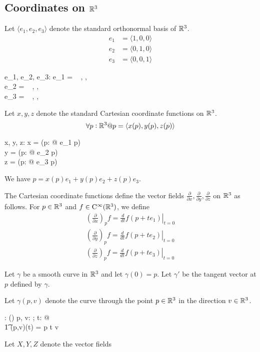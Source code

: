\documentclass[11pt, oneside]{article}
\begin{document}
\subsection{Coordinates on $\mathbb{R}^3$}

Let $\langle e_1, e_2, e_3 \rangle$ denote the standard orthonormal basis of $\mathbb{R}^3$.
\begin{align}
e_1 & = \langle1, 0, 0 \rangle \\
e_2 & = \langle 0, 1, 0 \rangle \\
e_3 & = \langle 0, 0, 1 \rangle
\end{align}
\begin{axdef}
	e_1, e_2, e_3: \Rthree
\where
	e_1 = \langle~ \oneR, \zeroR, \zeroR ~\rangle \\
	e_2 = \langle~ \zeroR, \oneR, \zeroR ~\rangle \\
	e_3 = \langle~ \zeroR, \zeroR, \oneR ~\rangle
\end{axdef}

Let $x, y, z$ denote the standard Cartesian coordinate functions on $\mathbb{R}^3$.
\begin{equation}
\forall p : \mathbb{R}^3 @ p = \langle x(p), y(p), z(p) \rangle
\end{equation}
\begin{axdef}
	x, y, z: \Rthree \fun \R
\where
	x = (\lambda p: \Rthree @ e_1 \dotR p) \\
	y = (\lambda p: \Rthree @ e_2 \dotR p) \\
	z = (\lambda p: \Rthree @ e_3 \dotR p)
\end{axdef}
\begin{remark}
We have $p = x(p) e_1 + y(p) e_2 + z(p) e_3$.
\end{remark}

The Cartesian coordinate functions define the vector fields $\frac{\partial}{\partial x}, \frac{\partial}{\partial y}, \frac{\partial}{\partial z}$
on $\mathbb{R}^3$ as follows. 
For $p \in \mathbb{R}^3$ and $f \in \operatorname{C^{\infty}}(\mathbb{R}^3)$, we define
\begin{align}
\left(\frac{\partial}{\partial x}\right)_p f = \left. \frac{d}{dt} f(p + t e_1) \right|_{t = 0} \\
\left(\frac{\partial}{\partial y}\right)_p f = \left. \frac{d}{dt} f(p + t e_2) \right|_{t = 0} \\
\left(\frac{\partial}{\partial z}\right)_p f = \left. \frac{d}{dt} f(p + t e_3) \right|_{t = 0}
\end{align}

Let $\gamma$ be a smooth curve in $\mathbb{R}^3$ and let $\gamma(0) = p$.
Let $\gamma'$ be the tangent vector at $p$ defined by $\gamma$.

Let $\gamma(p,v)$ denote the curve through the point $p \in \mathbb{R}^3$ in the direction $v \in \mathbb{R}^3$.
\begin{axdef}
	\gamma: \Rthree \cross \Rthree \fun (\R \fun \Rthree)
\where
	\forall p, v: \Rthree; t: \R @ \\
	\t1	\gamma(p,v)(t) = p \vaddR t \smulR v
\end{axdef}

Let $X, Y, Z$ denote the vector fields

\printbibliography
\end{document}
